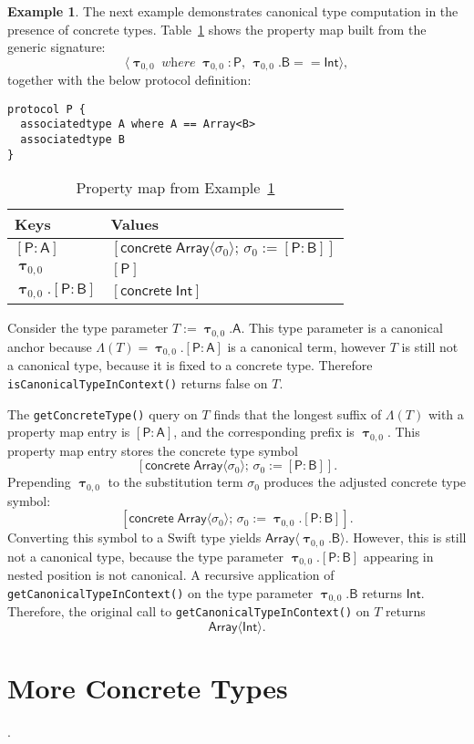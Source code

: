 \documentclass[headsepline,bibliography=totoc]{scrreport}
\newcommand{\namesym}[1]{\mathsf{#1}}
\newcommand{\proto}[1]{\bm{\mathsf{#1}}}
\newcommand{\protosym}[1]{[\proto{#1}]}
\newcommand{\gensig}[2]{\langle #1\;\textit{where}\;#2\rangle}
\newcommand{\genericsym}[2]{\bm{\uptau}_{#1,#2}}
\newcommand{\assocsym}[2]{[\proto{#1}\colon\namesym{#2}]}
\newcommand{\concretesym}[1]{[\mathsf{concrete}\;#1]}
\theoremstyle{definition}
\newtheorem{example}{Example}[chapter]
\theoremstyle{definition}
\theoremstyle{definition}
\begin{document}
\begin{example} \label{concretecanonicalpropertymapex}
The next example demonstrates canonical type computation in the presence of concrete types. Table~\ref{concretecanonicalpropertymap} shows the property map built from the generic signature:
\[\gensig{\genericsym{0}{0}}{\genericsym{0}{0}\colon\proto{P},\,\genericsym{0}{0}.\namesym{B}==\namesym{Int}},\]
together with the below protocol definition:
\begin{Verbatim}
protocol P {
  associatedtype A where A == Array<B>
  associatedtype B
}
\end{Verbatim}
\begin{table}\caption{Property map from Example~\ref{concretecanonicalpropertymapex}}\label{concretecanonicalpropertymap}
\begin{center}
\begin{tabular}{|l|l|}
\hline
Keys&Values\\
\hline
\hline
$\assocsym{P}{A}$&$\concretesym{\namesym{Array}\langle\sigma_0\rangle;\,\sigma_0:=\assocsym{P}{B}}$\\
$\genericsym{0}{0}$&$\protosym{P}$\\
$\genericsym{0}{0}.\assocsym{P}{B}$&$\concretesym{\namesym{Int}}$\\
\hline
\end{tabular}
\end{center}
\end{table}

Consider the type parameter $T:=\genericsym{0}{0}.\namesym{A}$. This type parameter is a canonical anchor because $\Lambda(T)=\genericsym{0}{0}.\assocsym{P}{A}$ is a canonical term, however $T$ is still not a canonical type, because it is fixed to a concrete type. Therefore \texttt{isCanonicalTypeInContext()} returns false on $T$.

The \texttt{getConcreteType()} query on $T$ finds that the longest suffix of $\Lambda(T)$ with a property map entry is $\assocsym{P}{A}$, and the corresponding prefix is $\genericsym{0}{0}$. This property map entry stores the concrete type symbol
\[\concretesym{\namesym{Array}\langle\sigma_0\rangle;\,\sigma_0:=\assocsym{P}{B}}.\]
Prepending $\genericsym{0}{0}$ to the substitution term $\sigma_0$ produces the adjusted concrete type symbol:
\[\concretesym{\namesym{Array}\langle\sigma_0\rangle;\,\sigma_0:=\genericsym{0}{0}.\assocsym{P}{B}}.\]
Converting this symbol to a Swift type yields $\namesym{Array}\langle\genericsym{0}{0}.\namesym{B}\rangle$. However, this is still not a canonical type, because the type parameter $\genericsym{0}{0}.\assocsym{P}{B}$ appearing in nested position is not canonical. A recursive application of \texttt{getCanonicalTypeInContext()} on the type parameter $\genericsym{0}{0}.\namesym{B}$ returns $\namesym{Int}$. Therefore, the original call to \texttt{getCanonicalTypeInContext()} on $T$ returns
\[\namesym{Array}\langle\namesym{Int}\rangle.\]
\end{example}

\section{More Concrete Types}\label{moreconcretetypes}.




\printindex
\end{document}
